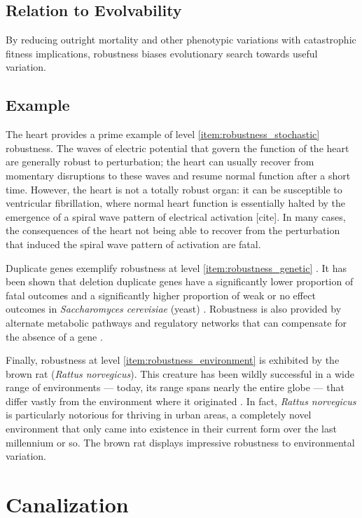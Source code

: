 \subsection{Relation to Evolvability}
By reducing outright mortality and other phenotypic variations with catastrophic fitness implications, robustness biases evolutionary search towards useful variation.\mindmapmark{\canalizationrobustness}

\subsection{Example}
The heart provides a prime example of level \ref{item:robustness_stochastic} robustness. The waves of electric potential that govern the function of the heart are generally robust to perturbation; the heart can usually recover from momentary disruptions to these waves and resume normal function after a short time. However, the heart is not a totally robust organ: it can be susceptible to ventricular fibrillation, where normal heart function is essentially halted by the emergence of a spiral wave pattern of electrical activation [cite]. In many cases, the consequences of the heart not being able to recover from the perturbation that induced the spiral wave pattern of activation are fatal.

Duplicate genes exemplify robustness at level \ref{item:robustness_genetic} \cite{Gu2003EvolutionMutations}. It has been shown that deletion duplicate genes have a significantly lower proportion of fatal outcomes and a significantly higher proportion of weak or no effect outcomes in \textit{Saccharomyces cerevisiae} (yeast) \cite{Gu2003EvolutionMutations}. Robustness is also provided by alternate metabolic pathways and regulatory networks that can compensate for the absence of a gene \cite{Gu2003EvolutionMutations}.

Finally, robustness at level \ref{item:robustness_environment} is exhibited by the brown rat (\textit{Rattus norvegicus}). This creature has been wildly successful in a wide range of environments --- today, its range spans nearly the entire globe --- that differ vastly from the environment where it originated \cite{Wikipediacontributors2016BrownRat}. In fact, \textit{Rattus norvegicus} is particularly notorious for thriving in urban areas, a completely novel environment that only came into existence in their current form over the last millennium or so. The brown rat displays impressive robustness to environmental variation.

\section{Canalization} \label{sec:canalization}
